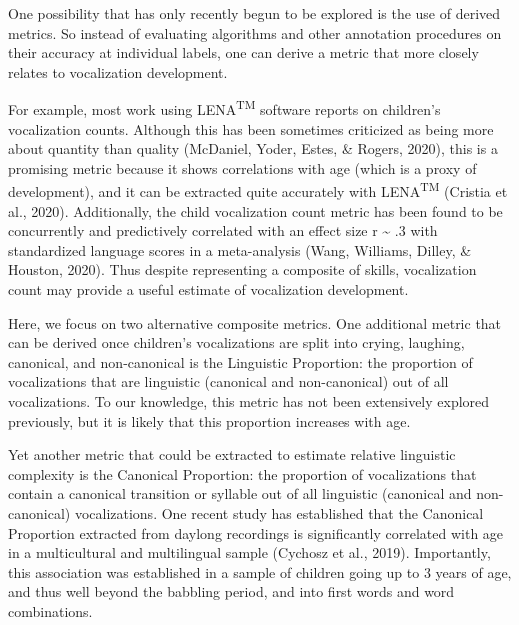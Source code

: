 \documentclass[english,,man]{apa6}
\begin{document}
One possibility that has only recently begun to be explored is the use of derived metrics. So instead of evaluating algorithms and other annotation procedures on their accuracy at individual labels, one can derive a metric that more closely relates to vocalization development.

For example, most work using LENA\textsuperscript{TM} software reports on children's vocalization counts. Although this has been sometimes criticized as being more about quantity than quality (McDaniel, Yoder, Estes, \& Rogers, 2020), this is a promising metric because it shows correlations with age (which is a proxy of development), and it can be extracted quite accurately with LENA\textsuperscript{TM} (Cristia et al., 2020). Additionally, the child vocalization count metric has been found to be concurrently and predictively correlated with an effect size r \textasciitilde{} .3 with standardized language scores in a meta-analysis (Wang, Williams, Dilley, \& Houston, 2020). Thus despite representing a composite of skills, vocalization count may provide a useful estimate of vocalization development.

Here, we focus on two alternative composite metrics. One additional metric that can be derived once children's vocalizations are split into crying, laughing, canonical, and non-canonical is the Linguistic Proportion: the proportion of vocalizations that are linguistic (canonical and non-canonical) out of all vocalizations. To our knowledge, this metric has not been extensively explored previously, but it is likely that this proportion increases with age.

Yet another metric that could be extracted to estimate relative linguistic complexity is the Canonical Proportion: the proportion of vocalizations that contain a canonical transition or syllable out of all linguistic (canonical and non-canonical) vocalizations. One recent study has established that the Canonical Proportion extracted from daylong recordings is significantly correlated with age in a multicultural and multilingual sample (Cychosz et al., 2019). Importantly, this association was established in a sample of children going up to 3 years of age, and thus well beyond the babbling period, and into first words and word combinations.
\end{document}
